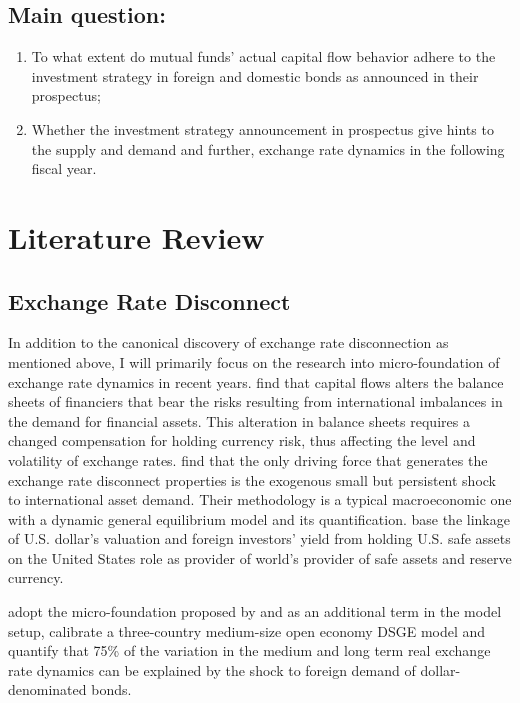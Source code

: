 \documentclass[12pt]{article} %
\begin{document}
	\subsection{Main question:}
	\begin{enumerate}
		\item To what extent do mutual funds' actual capital flow behavior adhere to the investment strategy in foreign and domestic bonds as announced in their prospectus;
		\item Whether the investment strategy announcement in prospectus give hints to the supply and demand and further, exchange rate dynamics in the following fiscal year.
	\end{enumerate}
		
		
		
\section{Literature Review}
\subsection{Exchange Rate Disconnect}
	In addition to the canonical discovery of exchange rate disconnection as mentioned above, I will primarily focus on the research into micro-foundation of exchange rate dynamics in recent years.  \cite{GabaixMaggiori2015} find that capital flows alters the balance sheets of financiers that bear the risks resulting from international imbalances in the demand for financial assets. This alteration in balance sheets requires a changed compensation for holding currency risk, thus affecting the level  and volatility of exchange rates. \cite{ItshkohiMukhin2021} find that the only driving force that generates the exchange rate disconnect properties is the exogenous small but persistent shock to international asset demand. Their methodology is a typical macroeconomic one with a dynamic general equilibrium model and its quantification. \cite{Jiangetal2021} base the linkage of U.S. dollar's valuation and foreign investors' yield from holding U.S. safe assets on the United States role as provider of world's provider of safe assets and reserve currency.\par 
	\cite{EichenbaumJohannsenRebelo2021} adopt the micro-foundation proposed by \cite{GabaixMaggiori2015} and \cite{ItshkohiMukhin2021} as an additional term in the model setup, calibrate a three-country medium-size open economy DSGE model and quantify that 75\% of the variation in the medium and long term real exchange rate dynamics can be explained by the shock to foreign demand of dollar-denominated bonds. 	
		
\end{document}
